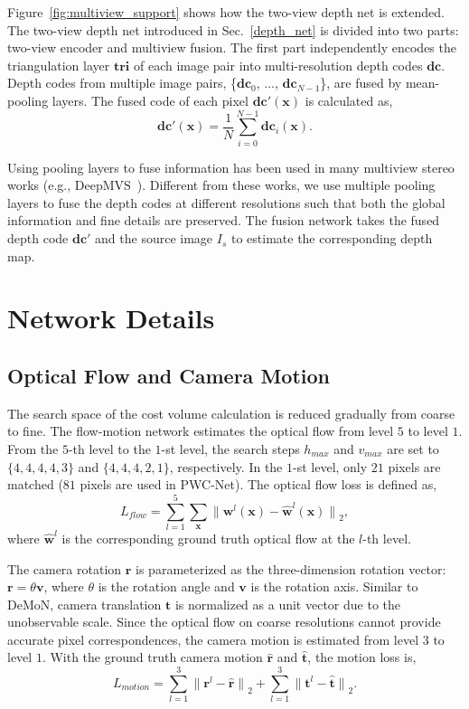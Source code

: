 \documentclass[letterpaper, 10 pt, conference]{ieeeconf}  %
\begin{document}
Figure~\ref{fig:multiview_support} shows how the two-view depth net is extended. The two-view depth net introduced in Sec.~\ref{depth_net} is divided into two parts: two-view encoder and multiview fusion. The first part independently encodes the triangulation layer $\mathbf{tri}$ of each image pair into multi-resolution depth codes $\mathbf{dc}$. Depth codes from multiple image pairs, \{$\mathbf{dc}_0$, ..., $\mathbf{dc}_{N-1}$\}, are fused by mean-pooling layers. The fused code of each pixel $\mathbf{dc}'(\mathbf{x})$ is calculated as,
\begin{equation}
\mathbf{dc}'(\mathbf{x}) = \frac{1}{N}\sum^{N-1}_{i=0}\mathbf{dc}_i(\mathbf{x}).
\end{equation}

Using pooling layers to fuse information has been used in many multiview stereo works (e.g., DeepMVS~\cite{DeepMVS}). Different from these works, we use multiple pooling layers to fuse the depth codes at different resolutions such that both the global information and fine details are preserved. The fusion network takes the fused depth code $\mathbf{dc}'$ and the source image $I_s$ to estimate the corresponding depth map.
 
\section{Network Details}
 
\subsection{Optical Flow and Camera Motion}
 
The search space of the cost volume calculation is reduced gradually from coarse to fine. The flow-motion network estimates the optical flow from level $5$ to level $1$. From the $5$-th level to the $1$-st level, the search steps $h_{max}$ and $v_{max}$ are set to $\{4,4,4,4,3\}$ and $\{4,4,4,2,1\}$, respectively. In the $1$-st level, only $21$ pixels are matched ($81$ pixels are used in PWC-Net). The optical flow loss is defined as,
\begin{equation}
L_{flow} = \sum_{l=1}^{5} \sum_{\mathbf{x}} { \lVert \mathbf{w}^l(\mathbf{x}) - \hat{\mathbf{w}}^l(\mathbf{x}) \rVert }_2,
\end{equation}
where $\hat{\mathbf{w}}^l$ is the corresponding ground truth optical flow at the $l$-th level.
 
The camera rotation $\mathbf{r}$ is parameterized as the three-dimension rotation vector: $\mathbf{r} = \theta\mathbf{v}$, where $\theta$ is the rotation angle and $\mathbf{v}$ is the rotation axis. Similar to DeMoN, camera translation $\mathbf{t}$ is normalized as a unit vector due to the unobservable scale. Since the optical flow on coarse resolutions cannot provide accurate pixel correspondences, the camera motion is estimated from level $3$ to level $1$. With the ground truth camera motion $\hat{\mathbf{r}}$ and $\hat{\mathbf{t}}$, the motion loss is,
\begin{equation}
L_{motion} = \sum_{l=1}^{3} { \lVert \mathbf{r}^l -\hat{\mathbf{r}} \rVert }_2 + \sum_{l=1}^{3} { \lVert \mathbf{t}^l -\hat{\mathbf{t}} \rVert }_2.
\end{equation}
 
\end{document}
